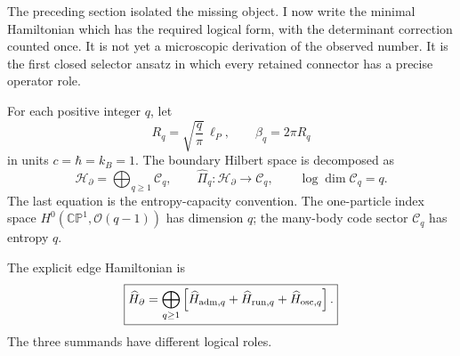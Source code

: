 \documentclass[aps,prd,reprint,nofootinbib,superscriptaddress,floatfix]{revtex4-2}
\numberwithin{equation}{section}
\theoremstyle{definition}
\theoremstyle{plain}
\newcommand{\CP}{\mathbb{CP}}
\begin{document}
The preceding section isolated the missing object.  I now write the minimal
Hamiltonian which has the required logical form, with the determinant correction
counted once.  It is not yet a microscopic
derivation of the observed number.  It is the first closed selector ansatz in
which every retained connector has a precise operator role.

For each positive integer \(q\), let
\begin{equation}
R_q=\sqrt{\frac{q}{\pi}}\,\ell_P,
\qquad
\beta_q=2\pi R_q
\end{equation}
in units \(c=\hbar=k_B=1\).  The boundary Hilbert space is decomposed as
\begin{equation}
\boxed{
\mathcal H_\partial
=
\bigoplus_{q\ge1}\mathcal C_q,
\qquad
\widehat\Pi_q:\mathcal H_\partial\to\mathcal C_q,
\qquad
\log\dim\mathcal C_q=q .
}
\end{equation}
The last equation is the entropy-capacity convention.  The one-particle
index space \(H^0(\CP^1,\mathcal O(q-1))\) has dimension \(q\); the many-body
code sector \(\mathcal C_q\) has entropy \(q\).

The explicit edge Hamiltonian is
\begin{equation}
\boxed{
\widehat H_\partial
=
\bigoplus_{q\ge1}
\left[
\widehat H_{{\rm adm},q}
+
\widehat H_{{\rm run},q}
+
\widehat H_{{\rm osc},q}
\right].
}
\label{eq:explicit-edge-H}
\end{equation}
The three summands have different logical roles.
\end{document}
